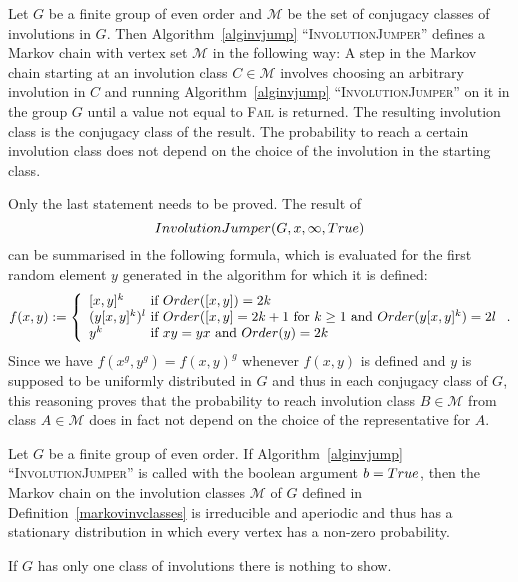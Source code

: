 \begin{DefProp}
%
\label{markovinvclasses}
Let $G$ be a finite group of even order and $\mathcal{M}$ be the set of
conjugacy classes of involutions in $G$. Then
Algorithm~\ref{alginvjump} ``\textsc{InvolutionJumper}'' defines a Markov
chain with vertex set $\mathcal{M}$ in the following way: A step in
the Markov chain starting at an involution class $C \in \mathcal{M}$
involves choosing an arbitrary involution in $C$ and running
Algorithm~\ref{alginvjump} ``\textsc{InvolutionJumper}'' on it in the group $G$
until a value not equal to \textsc{Fail} is returned. The resulting
involution class is the conjugacy class of the result. The
probability to reach a certain involution class does not depend on the
choice of the involution in the starting class.
\end{DefProp}
\proofbeg
Only the last statement needs to be proved. The result of
\[ \textsc{InvolutionJumper}(G,x,\infty,\textsc{True}) \] can
be summarised in the following formula, which is evaluated for the
first random element $y$ generated in the algorithm for which it is
defined:
\[ f(x,y)
    := \left\{ 
    \begin{array}{l@{\mbox{ if }}l}
        [x,y]^k & \textsc{Order}([x,y]) = 2k \\
        (y[x,y]^k)^l & \textsc{Order}([x,y]=2k+1 \mbox{ for } k \ge 1
                       \mbox{ and } \textsc{Order}(y[x,y]^k) = 2l \\
        y^k          & xy=yx \mbox{ and } \textsc{Order}(y) = 2k 
    \end{array}
    \right. .
\]
Since we have $f(x^g,y^g) = f(x,y)^g$ whenever $f(x,y)$ is defined and
$y$ is supposed to be uniformly distributed in $G$ and thus in each
conjugacy class of $G$, this reasoning proves that the probability to
reach involution class $B \in \mathcal{M}$ from class $A \in
\mathcal{M}$ does in fact not depend on the choice of the
representative for $A$.
\proofend

\begin{Prop}
\label{markovinvlimit}
Let $G$ be a finite group of even order.
If Algorithm~\ref{alginvjump} ``\textsc{InvolutionJumper}'' is called with
the boolean argument $b = \textsc{True}$, then the Markov chain on the 
involution classes $\mathcal{M}$ of $G$ defined in
Definition~\ref{markovinvclasses} is irreducible and
aperiodic and thus has a stationary distribution in which every vertex
has a non-zero probability.
\end{Prop}
\proofbeg
If $G$ has only one class of involutions there is nothing to show.

